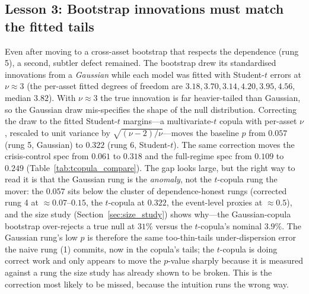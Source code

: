 \documentclass[pdflatex,sn-mathphys-num]{sn-jnl}
\theoremstyle{thmstyleone}
\theoremstyle{thmstyletwo}
\theoremstyle{thmstylethree}
\begin{document}
\subsection{Lesson 3: Bootstrap innovations must match the fitted tails}\label{sec:lesson3}

Even after moving to a cross-asset bootstrap that respects the dependence (rung 5), a second, subtler defect remained. The bootstrap drew its standardised innovations from a \emph{Gaussian} while each model was fitted with Student-$t$ errors at $\nu\approx 3$ (the per-asset fitted degrees of freedom are $3.18, 3.70, 3.14, 4.20, 3.95, 4.56$, median $3.82$). With $\nu\approx 3$ the true innovation is far heavier-tailed than Gaussian, so the Gaussian draw mis-specifies the shape of the null distribution. Correcting the draw to the fitted Student-$t$ margins---a multivariate-$t$ copula with per-asset $\nu$, rescaled to unit variance by $\sqrt{(\nu-2)/\nu}$---moves the baseline $p$ from $0.057$ (rung 5, Gaussian) to $0.322$ (rung 6, Student-$t$). The same correction moves the crisis-control spec from $0.061$ to $0.318$ and the full-regime spec from $0.109$ to $0.249$ (Table~\ref{tab:tcopula_compare}). The gap looks large, but the right way to read it is that the Gaussian rung is the \emph{anomaly}, not the $t$-copula rung the mover: the $0.057$ sits below the cluster of dependence-honest rungs (corrected rung 4 at $\approx 0.07$--$0.15$, the $t$-copula at $0.322$, the event-level proxies at $\approx 0.5$), and the size study (Section~\ref{sec:size_study}) shows why---the Gaussian-copula bootstrap over-rejects a true null at $31\%$ versus the $t$-copula's nominal $3.9\%$. The Gaussian rung's low $p$ is therefore the same too-thin-tails under-dispersion error the naive rung (1) commits, now in the copula's tails; the $t$-copula is doing correct work and only appears to move the $p$-value sharply because it is measured against a rung the size study has already shown to be broken. This is the correction most likely to be missed, because the intuition runs the wrong way.
\end{document}

